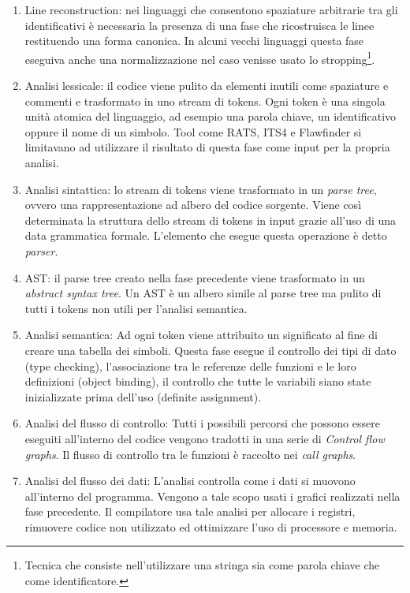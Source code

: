 \begin{enumerate}
\item Line reconstruction: nei linguaggi che consentono spaziature arbitrarie tra gli identificativi è necessaria la presenza di una fase che ricostruisca le linee restituendo una forma canonica. In alcuni vecchi linguaggi questa fase eseguiva anche una normalizzazione nel caso venisse usato lo stropping\footnote{Tecnica che consiste nell'utilizzare una stringa sia come parola chiave che come identificatore.}.
\item Analisi lessicale: il codice viene pulito da elementi inutili come spaziature e commenti e trasformato in uno stream di tokens. Ogni token è una singola unità atomica del linguaggio, ad esempio una parola chiave, un identificativo oppure il nome di un simbolo. Tool come RATS, ITS4 e Flawfinder si limitavano ad utilizzare il risultato di questa fase come input per la propria analisi.
\item Analisi sintattica: lo stream di tokens viene trasformato in un \emph{parse tree}, ovvero una rappresentazione ad albero del codice sorgente. Viene così determinata la struttura dello stream di tokens in input grazie all'uso di una data grammatica formale. L'elemento che esegue questa operazione è detto \emph{parser}.
\item AST: il parse tree creato nella fase precedente viene trasformato in un \emph{abstract syntax tree}. Un AST è un albero simile al parse tree ma pulito di tutti i tokens non utili per l'analisi semantica.
\item Analisi semantica: Ad ogni token viene attribuito un significato al fine di creare una tabella dei simboli. Questa fase esegue il controllo dei tipi di dato (type checking), l'associazione tra le referenze delle funzioni e le loro definizioni (object binding), il controllo che tutte le variabili siano state inizializzate prima dell'uso (definite assignment).
\item Analisi del flusso di controllo: Tutti i possibili percorsi che possono essere eseguiti all'interno del codice vengono tradotti in una serie di \emph{Control flow graphs}. Il flusso di controllo tra le funzioni è raccolto nei \emph{call graphs}.
\item Analisi del flusso dei dati: L'analisi controlla come i dati si muovono all'interno del programma. Vengono a tale scopo usati i grafici realizzati nella fase precedente. Il compilatore usa tale analisi per allocare i registri, rimuovere codice non utilizzato ed ottimizzare l'uso di processore e memoria.
\end{enumerate}


